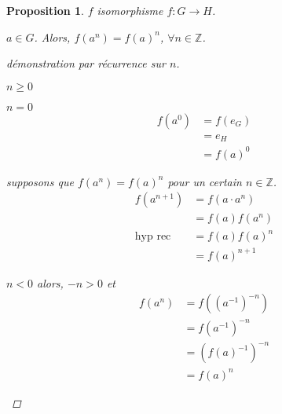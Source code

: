 \documentclass{report}
\newcommand*{\entiers}{\mathbb{Z}}
\newtheorem*{prop}{Proposition}
\theoremstyle{definition}
\theoremstyle{remark}
\begin{document}
	\begin{prop}
		$f$ isomorphisme $f:G \to H$.

		$a \in G$. Alors, $f(a^n)=f(a)^n$, $\forall n \in \entiers$.
		\begin{proof}[d\'emonstration par r\'ecurrence sur $n$]~

			\begin{ulist}
				\item[$n\geq 0$]
				\begin{nlist}
					\item $n=0$
					\begin{align*}
						f(a^0)&= f(e_G)\\
						&= e_H\\
						&= f(a)^0
					\end{align*}
					\item supposons que $f(a^n)=f(a)^n$ pour un certain $n \in \entiers$.
					\begin{align*}
						f(a^{n+1})&= f(a \cdot a^n)\\
						&= f(a)f(a^n)\\
						\text{hyp rec}&= f(a)f(a)^n\\
						&= f(a)^{n+1}
					\end{align*}
				\end{nlist}
				\item[$n<0$] alors, $-n>0$ et
				\begin{align*}
					f(a^n)&= f((a^{-1})^{-n})\\
					&= f(a^{-1})^{-n}\\
					&= (f(a)^{-1})^{-n}\\
					&= f(a)^n
				\end{align*}
			\end{ulist}
		\end{proof}
	\end{prop}
\end{document}
